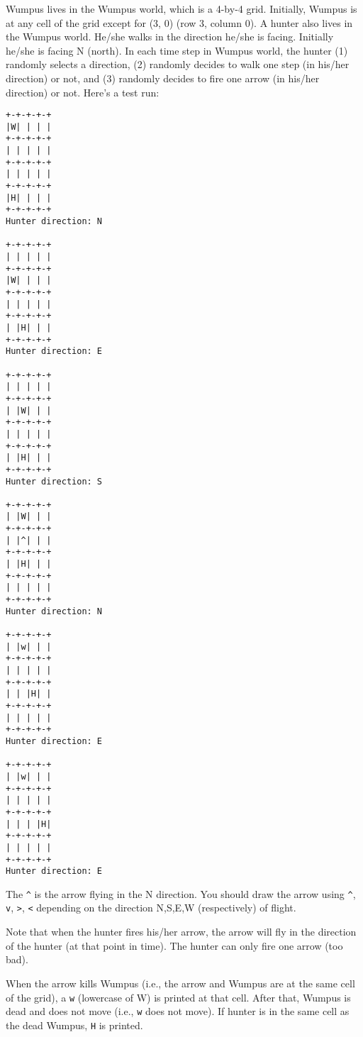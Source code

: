         

\renewcommand\AUTHOR{cadalebout1@cougars.ccis.edu} %


\topmattertwo

\nextq
Wumpus lives in the Wumpus world, which is a 4-by-4 grid.
Initially, Wumpus is at any cell of the grid except for (3, 0) (row 3,
column 0).
A hunter also lives in the Wumpus world.
He/she walks in the direction he/she is facing.
Initially he/she is facing N (north).
In each time step in Wumpus world, the hunter
(1) randomly selects a direction,
(2) randomly decides to walk one step (in his/her direction) or not,
and
(3) randomly decides to fire one arrow (in his/her direction) or not.
Here's a test run:
\begin{Verbatim}[frame=single,fontsize=\footnotesize]
+-+-+-+-+
|W| | | |
+-+-+-+-+
| | | | |
+-+-+-+-+
| | | | |
+-+-+-+-+
|H| | | |
+-+-+-+-+
Hunter direction: N

+-+-+-+-+
| | | | |
+-+-+-+-+
|W| | | |
+-+-+-+-+
| | | | |
+-+-+-+-+
| |H| | |
+-+-+-+-+
Hunter direction: E

+-+-+-+-+
| | | | |
+-+-+-+-+
| |W| | |
+-+-+-+-+
| | | | |
+-+-+-+-+
| |H| | |
+-+-+-+-+
Hunter direction: S

+-+-+-+-+
| |W| | |
+-+-+-+-+
| |^| | |
+-+-+-+-+
| |H| | |
+-+-+-+-+
| | | | |
+-+-+-+-+
Hunter direction: N

+-+-+-+-+
| |w| | |
+-+-+-+-+
| | | | |
+-+-+-+-+
| | |H| |
+-+-+-+-+
| | | | |
+-+-+-+-+
Hunter direction: E

+-+-+-+-+
| |w| | |
+-+-+-+-+
| | | | |
+-+-+-+-+
| | | |H|
+-+-+-+-+
| | | | |
+-+-+-+-+
Hunter direction: E
\end{Verbatim}
The \verb!^! is the arrow flying in the N direction.
You should draw the arrow using
\verb!^!,
\verb!v!,
\verb!>!,
\verb!<! depending on the direction
N,S,E,W (respectively)
of flight.

Note that when the hunter fires his/her arrow, the arrow will fly in the
direction of the hunter (at that point in time).
The hunter can only fire one arrow (too bad).

When the arrow kills Wumpus (i.e., the arrow and Wumpus are
at the same cell of the grid), a \verb!w! (lowercase of W)
is printed at that cell.
After that, Wumpus is dead and does not move (i.e., \verb!w! does not
move).
If hunter is in the same cell as the dead Wumpus, \verb!H! is printed.

